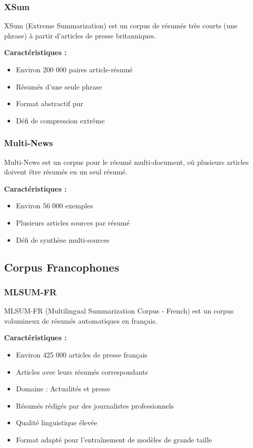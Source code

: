 \subsubsection{XSum}

XSum (Extreme Summarization) est un corpus de résumés très courts (une phrase) à partir d'articles de presse britanniques.

\textbf{Caractéristiques :}
\begin{itemize}
    \item Environ 200 000 paires article-résumé
    \item Résumés d'une seule phrase
    \item Format abstractif pur
    \item Défi de compression extrême
\end{itemize}

\subsubsection{Multi-News}

Multi-News est un corpus pour le résumé multi-document, où plusieurs articles doivent être résumés en un seul résumé.

\textbf{Caractéristiques :}
\begin{itemize}
    \item Environ 56 000 exemples
    \item Plusieurs articles sources par résumé
    \item Défi de synthèse multi-sources
\end{itemize}

\subsection{Corpus Francophones}

\subsubsection{MLSUM-FR}

MLSUM-FR (Multilingual Summarization Corpus - French) est un corpus volumineux de résumés automatiques en français.

\textbf{Caractéristiques :}
\begin{itemize}
    \item Environ 425 000 articles de presse français
    \item Articles avec leurs résumés correspondants
    \item Domaine : Actualités et presse
    \item Résumés rédigés par des journalistes professionnels
    \item Qualité linguistique élevée
    \item Format adapté pour l'entraînement de modèles de grande taille
\end{itemize}

